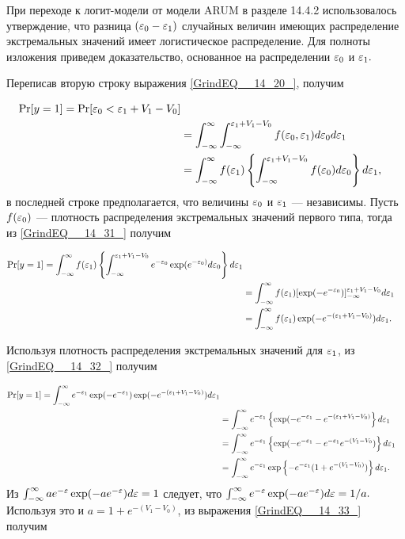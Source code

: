 При переходе к логит-модели от модели ARUM в разделе 14.4.2 использовалось утверждение,  что разница $(\varepsilon_0 - \varepsilon_1)$ случайных величин имеющих распределение экстремальных значений имеет логистическое распределение. Для полноты изложения приведем доказательство,  основанное на распределении $\varepsilon_0$ и  $\varepsilon_1.$

Переписав вторую строку выражения \eqref{GrindEQ__14_20_},  получим 

\begin{equation}
\label{GrindEQ__14_31_}
\begin{split}
\mathrm{Pr}[y=1] = \mathrm{Pr}[\varepsilon_0 < \varepsilon_1 + V_1 - V_0] \\
&= \int^{\infty}_{-\infty} \int^{\varepsilon_1 + V_1 - V_0}_{-\infty} f(\varepsilon_0, \varepsilon_1) d\varepsilon_0 d\varepsilon_1 \\
&= \int^{\infty}_{-\infty} f(\varepsilon_1) \left\{ \int^{\varepsilon_1 + V_1 - V_0}_{-\infty} f(\varepsilon_0) d\varepsilon_0 \right\} d\varepsilon_1, 
\end{split}
\end{equation} 
в последней строке предполагается,  что величины $\varepsilon_0$ и $\varepsilon_1$ --- независимы. Пусть $f(\varepsilon_0)$ --- плотность распределения экстремальных значений первого типа,  тогда из \eqref{GrindEQ__14_31_} получим 

\begin{equation} 
\label{GrindEQ__14_32_} 
\begin{split}
\mathrm{Pr}[y=1] = \int^{\infty}_{-\infty} f(\varepsilon_1) \left\{\int^{\varepsilon_1 + V_1 - V_0}_{-\infty} e^{-\varepsilon_0} \exp (e^{-\varepsilon_0)} d\varepsilon_0 \right\} d\varepsilon_1 \\
& = \int^{\infty}_{-\infty} f(\varepsilon_1) [\exp (-e^{-\varepsilon_0})]^{\varepsilon_1 + V_1 - V_0}_{-\infty} d\varepsilon_1 \\
& = \int^{\infty}_{-\infty} f(\varepsilon_1) \exp (-e^{-(\varepsilon_1 + V_1 - V_0)}) d\varepsilon_1.
\end{split}
\end{equation} 

Используя плотность распределения экстремальных значений для $\varepsilon_1$,  из \eqref{GrindEQ__14_32_} получим 

\begin{equation} 
\label{GrindEQ__14_33_} 
\begin{split}
\mathrm{Pr}[y=1] = \int^{\infty}_{-\infty} e^{-\varepsilon_1} \exp (-e^{-\varepsilon_1}) \exp (-e^{-(\varepsilon_1 + V_1 - V_0)}) d\varepsilon_1 \\
& = \int^{\infty}_{-\infty} e^{-\varepsilon_1} \left\{ \exp (-e^{-\varepsilon_1} - e^{-(\varepsilon_1 + V_1 - V_0)} \right\} d\varepsilon_1 \\
& = \int^{\infty}_{-\infty} e^{-\varepsilon_1} \left\{ \exp (-e^{-\varepsilon_1} - e^{-\varepsilon_1} e^{-(V_1 - V_0}) \right\}  d\varepsilon_1 \\
& = \int^{\infty}_{-\infty} e^{-\varepsilon_1} \exp  \left\{ -e^{-\varepsilon_1} (1+e^{-(V_1 - V_0)}) \right\} d\varepsilon_1.
\end{split}
\end{equation} 
Из $\int^{\infty}_{-\infty} ae^{-\varepsilon} \exp (-ae^{-\varepsilon}) d\varepsilon = 1$ следует,  что $\int^{\infty}_{-\infty} e^{-\varepsilon} \exp (-ae^{-\varepsilon}) d\varepsilon = 1/a.$ Используя это и $a = 1+e^{-(V_1 - V_0)}$,  из выражения \eqref{GrindEQ__14_33_} получим 

